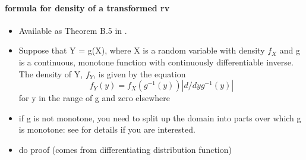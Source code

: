 \paragraph{formula for density of a transformed rv}

\begin{itemize}
\item Available as Theorem B.5 in \citet{Gre_2011}.
\item Suppose that Y = g(X), where X is a random variable with density
        $f_X$ and g is a continuous, monotone function with continuously
        differentiable inverse.  The
        density of Y, $f_Y$, is given by the equation
        \[ f_Y(y) = f_X(g^{-1}(y)) | d/dy g^{-1}(y) | \]
        for y in the range of g and zero elsewhere
\item if g is not monotone, you need to split up the domain into parts
        over which g is monotone: see \citet{CaB_2001} for details if
        you are interested.
\item do proof (comes from differentiating distribution function)
\end{itemize}


